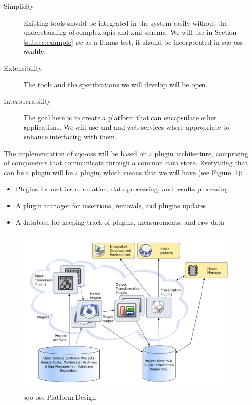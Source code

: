 \documentclass{llncs}
\begin{document}
\begin{description}
\item [Simplicity] Existing tools should be integrated in the system easily
without the understanding of complex {\sc api}s and {\sc xml} schema. We will
use in Section \ref{subsec:example} {\em wc} as a litmus test; it should be
incorporated in {\sc sqo-oss} readily.

\item [Extensibility] The tools and the specifications we will develop will
be open. 

\item [Interoperability] The goal here is to create a platform that can
encapsulate other applications. We will use {\sc xml} and web services where
appropriate to enhance interfacing with them.
\end{description}

The implementation of {\sc sqo-oss} will be based on a plugin architecture,
comprising of
components that communicate through a common data store. Everything
that can be a plugin will be a plugin, which means that we will have
(see Figure~\ref{fig:platform-implementation}):

\begin{itemize}
\item Plugins for metrics calculation, data processing, and results
  processing
\item A plugin manager for insertions, removals, and plugins updates
\item A database for keeping track of plugins, measurements, and raw data
\end{itemize}

\begin{figure}[htbp]
	\label{fig:platform-implementation}
	\begin{center}
	\includegraphics[scale=0.35]{platform-implementation}
	\caption{{\sc sqo-oss} Platform Design}
	\end{center}
\end{figure}
\end{document}
